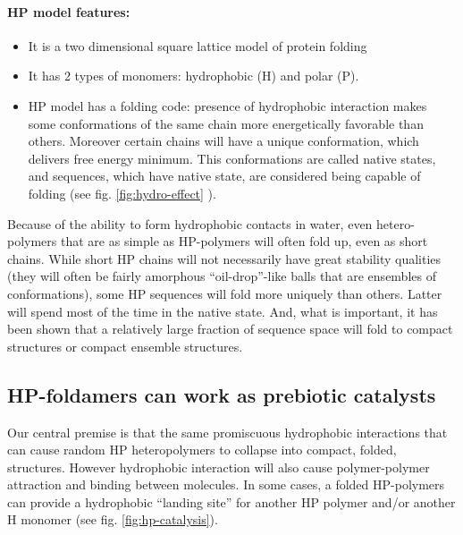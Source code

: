 \documentclass[twoside,twocolumn,9pt]{article}
\begin{document}
\paragraph{HP model features:} 
\begin{itemize}
 \item It is a two dimensional square lattice model of protein folding
 \item It has 2 types of monomers: hydrophobic (H) and polar (P). 
 \item HP model has a folding code: presence of hydrophobic interaction makes some conformations 
of the same chain more energetically favorable than others. Moreover certain chains will have a 
unique conformation, which delivers free energy minimum. This conformations are called native 
states, and sequences, which have native state, are considered being capable of folding (see fig. 
\ref{fig:hydro-effect} ).
\end{itemize}

Because of the ability to form hydrophobic contacts in water, even hetero-polymers that 
are as simple as HP-polymers will often fold up, even as short chains. 
While short HP chains will not necessarily have great stability qualities (they will often be 
fairly amorphous ``oil-drop''-like balls that are ensembles of conformations), some HP 
sequences will fold more uniquely than others. Latter will spend most of the time in the native 
state. And, what is important, it has been shown that a 
relatively large fraction of sequence space will fold to compact structures or compact ensemble 
structures\cite{lau1989lattice}.

\subsection{HP-foldamers can work as prebiotic catalysts}
Our central premise is that the same promiscuous hydrophobic interactions that can cause random 
HP heteropolymers to collapse into compact, folded, structures. However hydrophobic 
interaction will also cause polymer-polymer attraction and binding between molecules.  In some 
cases, a folded HP-polymers can provide a hydrophobic ``landing site'' for another HP polymer 
and/or another H monomer (see fig. \ref{fig:hp-catalysis}).  
\end{document}
